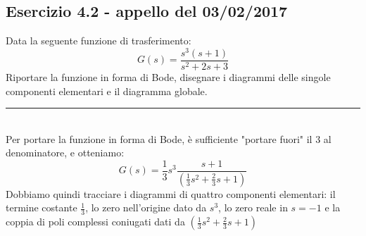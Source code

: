 \documentclass[12pt,a4paper]{article}
\begin{document}
	\subsection*{Esercizio 4.2 - appello del 03/02/2017} Data la seguente funzione di trasferimento:
	\[
		G(s) = \frac{s^3(s+1)}{s^2+2s+3}
	\]
	Riportare la funzione in forma di Bode, disegnare i diagrammi delle singole componenti elementari e il diagramma globale.
	\par\noindent\rule{\textwidth}{0.4pt}
	\vspace{5mm}
	\\
	Per portare la funzione in forma di Bode, \`e sufficiente "portare fuori" il 3 al denominatore, e otteniamo:
	\[
		G(s) = \frac{1}{3}s^3\frac{s+1}{\left(\frac{1}{3}s^2+\frac{2}{3}s+1\right)}
	\]
	Dobbiamo quindi tracciare i diagrammi di quattro componenti elementari: il termine costante $\frac{1}{3}$, lo zero nell'origine dato da $s^3$, lo zero reale in $s = -1$ e la coppia di poli complessi coniugati dati da $\left(\frac{1}{3}s^2+\frac{2}{3}s+1\right)$\\
\end{document}
